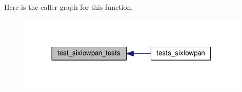 Here is the caller graph for this function\+:
\nopagebreak
\begin{figure}[H]
\begin{center}
\leavevmode
\includegraphics[width=312pt]{tests-sixlowpan_8c_ae33c8feed75ea771e169fe2b2f75fe8c_icgraph}
\end{center}
\end{figure}

